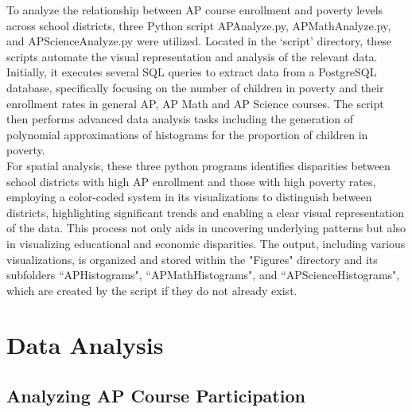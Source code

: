 \documentclass[sn-mathphys-num]{sn-jnl}%
\theoremstyle{thmstyleone}%
\theoremstyle{thmstyletwo}%
\theoremstyle{thmstylethree}%
\begin{document}
{To analyze the relationship between AP course enrollment and poverty levels across school districts, three Python script APAnalyze.py, APMathAnalyze.py, and APScienceAnalyze.py were utilized. Located in the `script' directory, these scripts automate the visual representation and analysis of the relevant data. Initially, it executes several SQL queries to extract data from a PostgreSQL database, specifically focusing on the number of children in poverty and their enrollment rates in general AP, AP Math and AP Science courses. The script then performs advanced data analysis tasks including the generation of polynomial approximations of histograms for the proportion of children in poverty.\\

For spatial analysis, these three python programs identifies disparities between school districts with high AP enrollment and those with high poverty rates, employing a color-coded system in its visualizations to distinguish between districts, highlighting significant trends and enabling a clear visual representation of the data. This process not only aids in uncovering underlying patterns but also in visualizing educational and economic disparities. The output, including various visualizations, is organized and stored within the "Figures" directory and its subfolders ``APHistograms", ``APMathHistograms", and ``APScienceHistograms", which are created by the script if they do not already exist.\\


\section{Data Analysis}
\subsection{Analyzing AP Course Participation}

}
\end{document}
